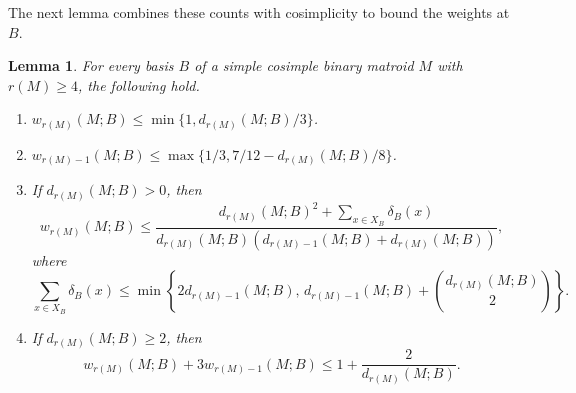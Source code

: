\documentclass[11pt]{article}
\numberwithin{equation}{section}
\newtheorem{lemma}[lemma]{Lemma}
\newcommand{\wloc}[1]{w_{#1}(M;B)}
\newcommand{\dloc}[1]{d_{#1}(M;B)}
\begin{document}
The next lemma combines these counts with cosimplicity
to bound the weights at \(B\).
\begin{lemma}\label{lem:local}
For every basis \(B\) of a simple cosimple binary matroid \(M\)
with \(r(M)\ge4\), the following hold.
\begin{enumerate}
\item[\(\mathrm{(i)}\)] \(\wloc{r(M)}\le\min\{1,\dloc{r(M)}/3\}\).
\item[\(\mathrm{(ii)}\)]\(\wloc{r(M)-1}\le\max\{1/3,7/12-\dloc{r(M)}/8\}\).
\item[\(\mathrm{(iii)}\)] If \(\dloc{r(M)}>0\), then
\[
 \wloc{r(M)}\le
 \frac{\dloc{r(M)}^2+\sum_{x\in X_B}\delta_B(x)}
 {\dloc{r(M)}(\dloc{r(M)-1}+\dloc{r(M)})},
\]
where
\[
 \sum_{x\in X_B}\delta_B(x)
 \le\min\left\{2\dloc{r(M)-1},\,
 \dloc{r(M)-1}+\binom{\dloc{r(M)}}2\right\}.
\]
\item[\(\mathrm{(iv)}\)] If \(\dloc{r(M)}\ge2\), then
\[
 \wloc{r(M)}+3\wloc{r(M)-1}
 \le1+\frac2{\dloc{r(M)}}.
\]
\end{enumerate}
\end{lemma}
\end{document}
